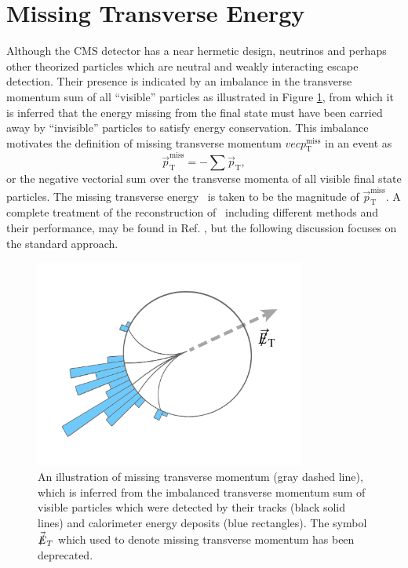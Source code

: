 \section{Missing Transverse Energy}

Although the CMS detector has a near hermetic design, neutrinos and perhaps other theorized particles which are neutral and weakly interacting escape detection. Their presence is indicated by an imbalance in the transverse momentum sum of all ``visible'' particles as illustrated in Figure \ref{fig:metdiag}, from which it is inferred that the energy missing from the final state must have been carried away by ``invisible'' particles to satisfy energy conservation. This imbalance motivates the definition of missing transverse momentum $vec{p}_{\mathrm{T}}^{\mathrm{miss}}$ in an event as
\begin{equation}
  \vec{p}_{\mathrm{T}}^{\mathrm{miss}} = - \sum \vec{p}_{\mathrm{T}},
  \label{eq:rawmet}
\end{equation}
or the negative vectorial sum over the transverse momenta of all visible final state particles. The missing transverse energy \pTmiss\ is taken to be the magnitude of $\vec{p}_{\mathrm{T}}^{\mathrm{miss}}$. A complete treatment of the reconstruction of \pTmiss\, including different methods and their performance, may be found in Ref. \cite{CMSMET}, but the following discussion focuses on the standard approach.

\begin{figure}[htbp]
  \centering
    \includegraphics[width=3.5in]{images/met_schematic}
    \caption[Illustration of Missing Transverse Momentum]{An illustration of missing transverse momentum \pTmiss (gray dashed line), which is inferred from the imbalanced transverse momentum sum of visible particles which were detected by their tracks (black solid lines) and calorimeter energy deposits (blue rectangles). The symbol $\vec{\slashed{E}}_{T}$ which used to denote missing transverse momentum has been deprecated.\cite{METDIAGRAM}}
    \label{fig:metdiag}
\end{figure}

